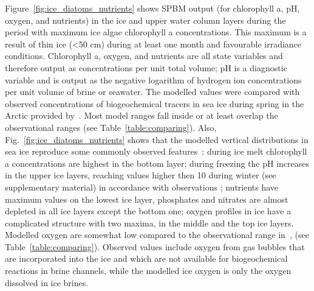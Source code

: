 \documentclass[gmd, manuscript]{copernicus}
\begin{document}
Figure~\ref{fig:ice_diatoms_nutrients} shows \textrm{SPBM} output (for chlorophyll a, pH, oxygen, and nutrients) in the ice and upper water column layers during the period with maximum ice algae chlorophyll a concentrations.
This maximum is a result of thin ice (<50 \unit{cm}) during at least one month and favourable irradiance conditions.
Chlorophyll a, oxygen, and nutrients are all state variables and therefore output as concentrations per unit total volume;
pH is a diagnostic variable and is output as the negative logarithm of hydrogen ion concentrations per unit volume of brine or seawater.
The modelled values were compared with observed concentrations of biogeochemical tracers in sea ice during spring in the Arctic provided by~\citet[Figure 3, p.~210]{Vancoppenolle2013}.
Most model ranges fall inside or at least overlap the observational ranges (see Table~\ref{table:comparing}).
Also, Fig.~\ref{fig:ice_diatoms_nutrients} shows that the modelled vertical distributions in sea ice reproduce some commonly observed features~\citep{Vancoppenolle2013}:
during ice melt chlorophyll a concentrations are highest in the bottom layer;
during freezing the pH increases in the upper ice layers, reaching values higher then 10 during winter (see supplementary material) in accordance with observations \citep{Thomas2002};
nutrients have maximum values on the lowest ice layer, phosphates and nitrates are almost depleted in all ice layers except the bottom one;
oxygen profiles in ice have a complicated structure with two maxima, in the middle and the top ice layers.
Modelled oxygen are somewhat low compared to the observational range in~\citet{Vancoppenolle2013}, \citet{Rysgaard2004} (see Table~\ref{table:comparing}).
Observed values include oxygen from gas bubbles that are incorporated into the ice and which are not available for biogeochemical reactions in brine channels, while the modelled ice oxygen is only the oxygen dissolved in ice brines.
\end{document}
